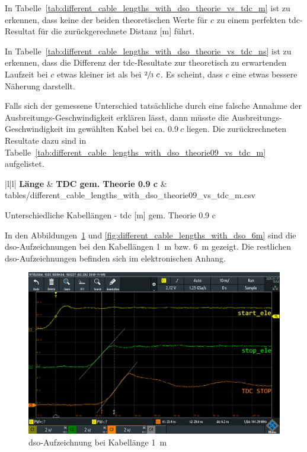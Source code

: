 In Tabelle~\ref{tab:different_cable_lengths_with_dso_theorie_vs_tdc_m} ist zu erkennen, dass keine der beiden
theoretischen Werte für $c$ zu einem perfekten \acrshort{tdc}-Resultat für die zurückgerechnete Distanz [m] führt.

In Tabelle~\ref{tab:different_cable_lengths_with_dso_theorie_vs_tdc_ns} ist zu erkennen, dass die Differenz der
\acrshort{tdc}-Resultate zur theoretisch zu erwartenden Laufzeit bei $c$ etwas kleiner ist als bei $\sfrac{2}{3}~c$. Es
scheint, dass $c$ eine etwas bessere Näherung darstellt.

Falls sich der gemessene Unterschied tatsächliche durch eine falsche Annahme der Ausbreitungs-Geschwindigkeit erklären
lässt, dann müsste die Ausbreitungs-Geschwindigkeit im gewählten Kabel bei ca. $0.9~c$ liegen. Die zurückrechneten
Resultate dazu sind in Tabelle~\ref{tab:different_cable_lengths_with_dso_theorie09_vs_tdc_m} aufgelistet.

\begin{table}[H]
    \mytable
        {|l|l|}
        {\textbf{Länge} & \textbf{TDC gem. Theorie 0.9 c}}
        {\length & \tdcgemtheoriemc}
        {tables/different_cable_lengths_with_dso_theorie09_vs_tdc_m.csv}
    \caption{Unterschiedliche Kabellängen - \acrshort{tdc} [m] gem. Theorie 0.9 c}\label{tab:different_cable_lengths_with_dso_theorie09_vs_tdc_m}
\end{table}

In den Abbildungen~\ref{fig:different_cable_lengths_with_dso_1m} und \ref{fig:different_cable_lengths_with_dso_6m} sind
die \acrshort{dso}-Aufzeichnungen bei den Kabellängen 1~m bzw. 6~m gezeigt. Die restlichen \acrshort{dso}-Aufzeichnungen
befinden sich im elektronischen Anhang.

\begin{figure}[H]
    \centering
    \includegraphics[width=\textwidth]{graphics/different_cable_lengths_with_dso_1m.png}
    \caption{\acrshort{dso}-Aufzeichnung bei Kabellänge 1~m}\label{fig:different_cable_lengths_with_dso_1m}
\end{figure}

